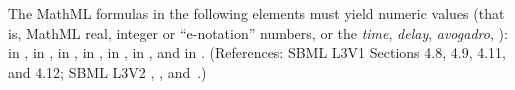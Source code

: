 The MathML formulas in the following elements must yield numeric
values (that is, MathML real, integer or ``e-notation'' numbers,
or the \emph{time}, \emph{delay}, \emph{avogadro},  ):
 in \KineticLaw,  in
\InitialAssignment,  in \AssignmentRule,  in
\RateRule,  in \AlgebraicRule,  in \Event
\Delay, and  in \EventAssignment.  (References: SBML L3V1 Sections 4.8, 4.9, 4.11, and 4.12; SBML L3V2 
, , 
 and~.)



